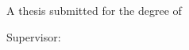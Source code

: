 \begin{titlepage}
\thispagestyle{empty}
\centering

\vspace*{0.16\textheight}
{\Huge\bfseries \thesistitle \par}
\vspace{1.25em}
{\Large \thesissubtitle \par}

\vfill

{\Large \thesisauthor \par}
\vspace{1.5em}
{\large A thesis submitted for the degree of \thesisdegree \par}
\vspace{1.5em}
{\large \thesisdepartment \par}
{\large \thesisinstitution \par}
\vspace{1.5em}
{\large Supervisor: \thesissupervisor \par}

\vfill

{\large \thesisdate \par}
\end{titlepage}

